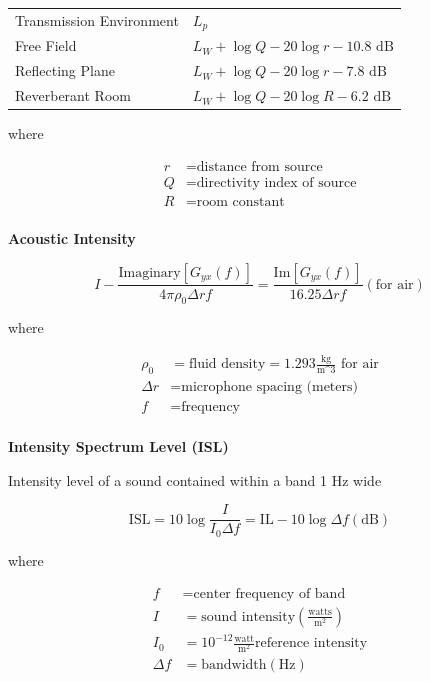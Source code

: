 \documentclass[
]{book}
\begin{document}
\begin{longtable}[]{@{}ll@{}}
\toprule
\endhead
Transmission Environment & \(L_p\)\tabularnewline
Free Field & \(L_W + \log Q - 20 \log r - 10.8 \text{ dB}\)\tabularnewline
Reflecting Plane & \(L_W + \log Q - 20 \log r - 7.8 \text{ dB}\)\tabularnewline
Reverberant Room & \(L_W + \log Q - 20 \log R - 6.2 \text{ dB}\)\tabularnewline
\bottomrule
\end{longtable}

where

\[
\begin{align}
r &= \text{distance from source}\\
Q &= \text{directivity index of source}\\
R &= \text{room constant}\\
\end{align}
\]

\textbf{Acoustic Intensity}

\[
I - \frac{\text{Imaginary} \left[ G_{yx} \left( f \right) \right]}{4 \pi \rho_0 \Delta r f} = \frac{\text{Im} \left[ G_{yx} \left( f \right) \right]}{16.25 \Delta r f} \left( \text{for air} \right)
\]

where

\[
\begin{align}
\rho_0 &= \text{fluid density} = 1.293 \frac{\text{kg}}{\text{m^3}} \text{ for air}\\
\Delta r &= \text{microphone spacing (meters)}\\
f &= \text{frequency}\\
\end{align}
\]

\textbf{Intensity Spectrum Level (ISL)}

Intensity level of a sound contained within a band 1 \(\text{Hz}\) wide

\[
\mathrm{ISL} = 10 \log \frac{I}{I_0 \Delta f} = \mathrm{IL} - 10 \log \Delta f \left( \text{dB} \right)
\]

where

\[
\begin{align}
f &= \text{center frequency of band} \\
I &= \text{sound intensity} \left( \frac{\text{watts}}{\text{m}^2} \right) \\
I_0 &= 10^{-12} \frac{\text{watt}}{\text{m}^2} \text{reference intensity} \\
\Delta f &= \text{bandwidth} \left( \text{Hz} \right) \\
\end{align}
\]
\end{document}
